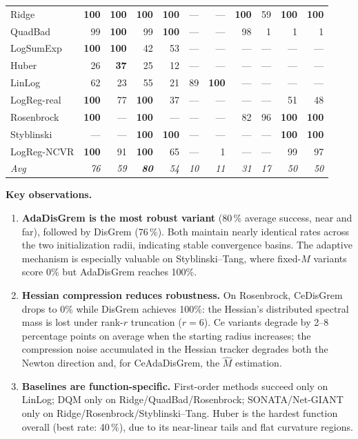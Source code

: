 \documentclass[10pt,twocolumn,letterpaper]{article}
\theoremstyle{compact}
\theoremstyle{compactremark}
\begin{document}
\begin{table}[t]
\begin{tabular}{l rrrr rr rrrr}
			\midrule
			Ridge       & \textbf{100} & \textbf{100} & \textbf{100} & \textbf{100} & --- & --- & \textbf{100} & 59  & \textbf{100} & \textbf{100} \\
			QuadBad     & 99  & \textbf{100} & 99  & \textbf{100} & --- & --- & 98  & 1   & 1   & 1   \\
			LogSumExp   & \textbf{100} & \textbf{100} & 42  & 53  & --- & --- & --- & --- & --- & --- \\
			Huber       & 26  & \textbf{37}  & 25  & 12  & --- & --- & --- & --- & --- & --- \\
			LinLog      & 62  & 23  & 55  & 21  & 89  & \textbf{100} & --- & --- & --- & --- \\
			LogReg-real & \textbf{100} & 77  & \textbf{100} & 37  & --- & --- & --- & --- & 51  & 48  \\
			Rosenbrock  & \textbf{100} & --- & \textbf{100} & --- & --- & --- & 82  & 96  & \textbf{100} & \textbf{100} \\
			Styblinski  & --- & --- & \textbf{100} & \textbf{100} & --- & --- & --- & --- & \textbf{100} & \textbf{100} \\
			LogReg-NCVR & \textbf{100} & 91  & \textbf{100} & 65  & --- & 1   & --- & --- & 99  & 97  \\
			\textit{Avg} & \textit{76} & \textit{59} & \textbf{\textit{80}} & \textit{54}
			& \textit{10} & \textit{11} & \textit{31} & \textit{17}
			& \textit{50} & \textit{50} \\
			\bottomrule
		\end{tabular}
	\end{table}
	
	\noindent\textbf{Key observations.}
	\begin{enumerate}[leftmargin=1.4em,itemsep=2pt]
		\item \textbf{AdaDisGrem is the most robust variant}
		(80\,\% average success, near and far), followed by DisGrem (76\,\%).
		Both maintain nearly identical rates across the two initialization
		radii, indicating stable convergence basins.
		The adaptive mechanism is especially valuable on
		Styblinski--Tang, where fixed-$M$ variants score 0\% but
		AdaDisGrem reaches 100\%.

		\item \textbf{Hessian compression reduces robustness.}
		On Rosenbrock, CeDisGrem drops to 0\% while DisGrem achieves 100\%:
		the Hessian's distributed spectral mass is lost under rank-$r$
		truncation ($r{=}6$).
		Ce variants degrade by 2--8 percentage points on average when
		the starting radius increases; the compression noise accumulated
		in the Hessian tracker degrades both the Newton direction and,
		for CeAdaDisGrem, the $\hat M$ estimation.

		\item \textbf{Baselines are function-specific.}
		First-order methods succeed only on LinLog; DQM only on
		Ridge/QuadBad/Rosenbrock; SONATA/Net-GIANT only on
		Ridge/Rosenbrock/Styblinski--Tang.
		Huber is the hardest function overall (best rate: 40\,\%),
		due to its near-linear tails and flat curvature regions.
	\end{enumerate}
	
\end{document}
